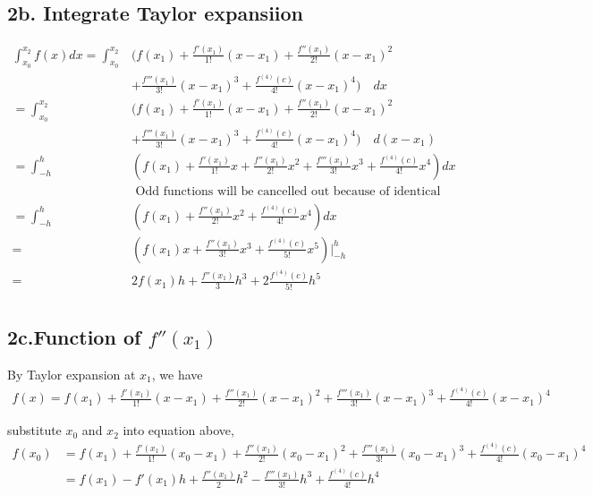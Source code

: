 \documentclass{article}
\begin{document}
\subsection*{2b. Integrate Taylor expansiion}
\begin{equation}
  \begin{split}
      \int^{x_2}_{x_0} f(x) dx = \int^{x_2}_{x_0} & (f(x_1) + \frac{f'(x_1)}{1!}(x-x_1) + \frac{f''(x_1)}{2!} (x-x_1)^2 \\
      &+ \frac{f'''(x_1)}{3!} (x-x_1)^3 + \frac{f^{(4)} (c)}{4!} (x-x_1)^4) \quad dx\\
      = \int^{x_2}_{x_0} & (f(x_1) + \frac{f'(x_1)}{1!}(x-x_1) + \frac{f''(x_1)}{2!} (x-x_1)^2 \\
      &+ \frac{f'''(x_1)}{3!} (x-x_1)^3 + \frac{f^{(4)} (c)}{4!} (x-x_1)^4) \quad d(x-x_1)\\
      = \int^{h}_{-h} & (f(x_1) + \frac{f'(x_1)}{1!} x + \frac{f''(x_1)}{2!} x^2 + \frac{f'''(x_1)}{3!} x^3 + \frac{f^{(4)} (c)}{4!} x^4)dx\\
      &\text{ Odd functions will be cancelled out because of identical positive and negative area }\\
      = \int^{h}_{-h} & (f(x_1) + \frac{f''(x_1)}{2!} x^2 +  \frac{f^{(4)} (c)}{4!} x^4)dx\\
      =&  (f(x_1) x  + \frac{f''(x_1)}{3!} x^3 +  \frac{f^{(4)} (c)}{5!} x^5) \Big\vert^{h}_{-h}\\
      =&  2 f(x_1) h    + \frac{f''(x_1)}{3} h^3 +  2 \frac{f^{(4)} (c)}{5!} h^5 \\
  \end{split}
\end{equation}



\subsection*{2c.Function of  $f''(x_1)$ }
By Taylor expansion at $x_1$, we have
\begin{equation}
  \begin{split}
    f(x) = f(x_1) + \frac{f'(x_1)}{1!}(x-x_1) + \frac{f''(x_1)}{2!} (x-x_1)^2 + \frac{f'''(x_1)}{3!} (x-x_1)^3 + \frac{f^{(4)} (c)}{4!} (x-x_1)^4
  \end{split}
\end{equation}

substitute $x_0$ and $x_2$ into equation above,
\begin{equation}
  \begin{split}
    f(x_0) &= f(x_1) + \frac{f'(x_1)}{1!}(x_0-x_1) + \frac{f''(x_1)}{2!} (x_0-x_1)^2 + \frac{f'''(x_1)}{3!} (x_0-x_1)^3 + \frac{f^{(4)} (c)}{4!} (x_0-x_1)^4\\
    &= f(x_1) - f'(x_1) h + \frac{f''(x_1)}{2} h^2  - \frac{f'''(x_1)}{3!} h^3 + \frac{f^{(4)} (c)}{4!} h^4\\
  \end{split}
\end{equation}
\end{document}
